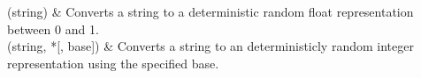 \documentclass[letterpaper,10pt,english]{sphinxmanual}
\begin{document}
\begin{savenotes}\sphinxattablestart
\sphinxthistablewithglobalstyle
\sphinxthistablewithnovlinesstyle
\centering
\begin{tabulary}{\linewidth}[t]{}
\sphinxtoprule
\sphinxtableatstartofbodyhook
\sphinxAtStartPar
{\hyperref[\detokenize{generated/eflatun_uav.helpers.number_generators:eflatun_uav.helpers.number_generators.convert_string_to_float}]{}}(string)
&
\sphinxAtStartPar
Converts a string to a deterministic random float representation between 0 and 1.
\\
\sphinxhline
\sphinxAtStartPar
{\hyperref[\detokenize{generated/eflatun_uav.helpers.number_generators:eflatun_uav.helpers.number_generators.convert_string_to_int}]{}}(string, *{[}, base{]})
&
\sphinxAtStartPar
Converts a string to an deterministicly random integer representation using the specified base.
\\
\sphinxbottomrule
\end{tabulary}
\sphinxtableafterendhook\par
\sphinxattableend\end{savenotes}
\end{document}
